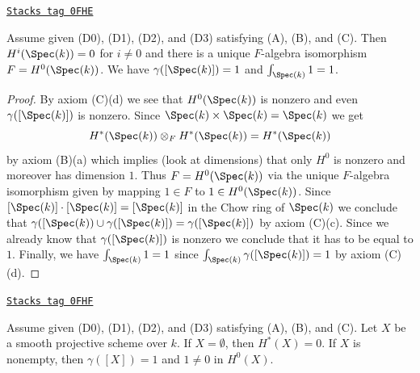\begin{lemma}[Base]
\label{weil-lemma-base}
\href{https://stacks.math.columbia.edu/tag/0FHE}{\texttt{Stacks tag 0FHE}}

Assume given (D0), (D1), (D2), and (D3) satisfying (A), (B), and (C).
Then $H^i(\Spec(k)) = 0$ for $i \not = 0$ and there is a
unique $F$-algebra isomorphism $F = H^0(\Spec(k))$.
We have $\gamma([\Spec(k)]) = 1$ and $\int_{\Spec(k)} 1 = 1$.
\end{lemma}

\begin{proof}
By axiom (C)(d) we see that $H^0(\Spec(k))$ is nonzero and even
$\gamma([\Spec(k)])$ is nonzero.
Since $\Spec(k) \times \Spec(k) = \Spec(k)$ we get
$$
H^*(\Spec(k)) \otimes_F H^*(\Spec(k)) = H^*(\Spec(k))
$$
by axiom (B)(a) which implies (look at dimensions) that only
$H^0$ is nonzero and moreover has dimension $1$. Thus
$F = H^0(\Spec(k))$ via the unique $F$-algebra isomorphism
given by mapping $1 \in F$ to $1 \in H^0(\Spec(k))$.
Since $[\Spec(k)] \cdot [\Spec(k)] = [\Spec(k)]$ in the
Chow ring of $\Spec(k)$ we conclude that
$\gamma([\Spec(k)) \cup \gamma([\Spec(k)]) = \gamma([\Spec(k)])$
by axiom (C)(c). Since we already know that $\gamma([\Spec(k)])$ is nonzero
we conclude that it has to be equal to $1$.
Finally, we have $\int_{\Spec(k)} 1 = 1$ since
$\int_{\Spec(k)} \gamma([\Spec(k)]) = 1$
by axiom (C)(d).
\end{proof}

\begin{lemma}[Unit]
\label{weil-lemma-unit}
\href{https://stacks.math.columbia.edu/tag/0FHF}{\texttt{Stacks tag 0FHF}}

Assume given (D0), (D1), (D2), and (D3) satisfying (A), (B), and (C).
Let $X$ be a smooth projective scheme over $k$.
If $X = \emptyset$, then $H^*(X) = 0$.
If $X$ is nonempty, then $\gamma([X]) = 1$ and $1 \not = 0$ in $H^0(X)$.
\end{lemma}

